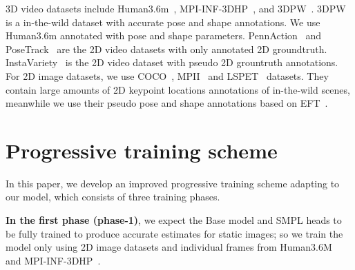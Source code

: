 3D video datasets include Human3.6m~\citep{h36m:ionescu2013human3}, MPI-INF-3DHP~\citep{mpii3d:mehta2017monocular}, and 3DPW~\citep{3dpw:von2018recovering}. 3DPW~\citep{3dpw:von2018recovering} is a in-the-wild dataset with accurate pose and shape annotations. We use Human3.6m annotated with pose and shape parameters.
PennAction~\citep{pennaction:zhang2013actemes} and PoseTrack~\citep{posetrack:andriluka2018posetrack} are the 2D video datasets with only annotated 2D groundtruth. InstaVariety~\citep{insta:kanazawa2019learning} is the 2D video dataset with pseudo 2D grountruth annotations. For 2D image datasets, we use COCO~\citep{coco:lin2014microsoft}, MPII~\citep{mpii:andriluka14cvpr} and LSPET~\citep{lspet:Johnson11} datasets. They contain large amounts of 2D keypoint locations annotations of in-the-wild scenes, meanwhile we use their pseudo pose and shape annotations based on EFT~\citep{eft:oo2020exemplar}.

\section{Progressive training scheme}
\label{appendix:training}
In this paper,  we develop an improved progressive training scheme adapting to our model, which consists of three training phases. 

\textbf{In the first phase (phase-1)}, we expect the Base model and SMPL heads to be fully trained to produce accurate estimates for static images; so we train the model only using 2D image datasets and individual frames from Human3.6M~\citep{h36m:ionescu2013human3} and MPI-INF-3DHP~\citep{mpii3d:mehta2017monocular}. 

